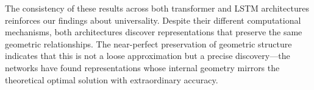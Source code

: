 \documentclass[prx,nofootinbib,onecolumn,showkeys,groupaddress,preprintnumbers,floatfix,
superscriptaddress]{revtex4-1}
\begin{document}
The consistency of these results across both transformer and LSTM architectures reinforces our findings about universality. Despite their different computational mechanisms, both architectures discover representations that preserve the same geometric relationships. The near-perfect preservation of geometric structure indicates that this is not a loose approximation but a precise discovery—the networks have found representations whose internal geometry mirrors the theoretical optimal solution with extraordinary accuracy.









%


\end{document}

